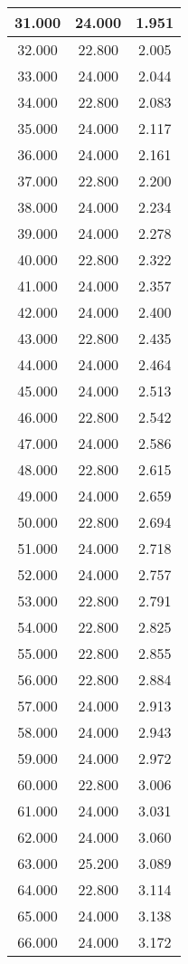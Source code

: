 \begin{longtable}[c]{|c|c|c|}
31.000	&24.000&1.951  \\ \hline 	
32.000	&22.800&2.005  \\ \hline 	
33.000	&24.000&2.044  \\ \hline 	
34.000	&22.800&2.083  \\ \hline 	
35.000	&24.000&2.117  \\ \hline 	
36.000	&24.000&2.161  \\ \hline 	
37.000	&22.800&2.200  \\ \hline 	
38.000	&24.000&2.234  \\ \hline 	
39.000	&24.000&2.278  \\ \hline 	
40.000	&22.800&2.322  \\ \hline 	
41.000	&24.000&2.357  \\ \hline 	
42.000	&24.000&2.400  \\ \hline 	
43.000	&22.800&2.435  \\ \hline 	
44.000	&24.000&2.464  \\ \hline 	
45.000	&24.000&2.513  \\ \hline 	
46.000	&22.800&2.542  \\ \hline 	
47.000	&24.000&2.586  \\ \hline 	
48.000	&22.800&2.615  \\ \hline 	
49.000	&24.000&2.659  \\ \hline 	
50.000	&22.800&2.694  \\ \hline 	
51.000	&24.000&2.718  \\ \hline 	
52.000	&24.000&2.757  \\ \hline 	
53.000	&22.800&2.791  \\ \hline 	
54.000	&22.800&2.825  \\ \hline 	
55.000	&22.800&2.855  \\ \hline 	
56.000	&22.800&2.884  \\ \hline 	
57.000	&24.000&2.913  \\ \hline 	
58.000	&24.000&2.943  \\ \hline 	
59.000	&24.000&2.972  \\ \hline 	
60.000	&22.800&3.006  \\ \hline 	
61.000	&24.000&3.031  \\ \hline 	
62.000	&24.000&3.060  \\ \hline 	
63.000	&25.200&3.089  \\ \hline 	
64.000	&22.800&3.114  \\ \hline 	
65.000	&24.000&3.138  \\ \hline 	
66.000	&24.000&3.172  \\ \hline 	

\end{longtable}
